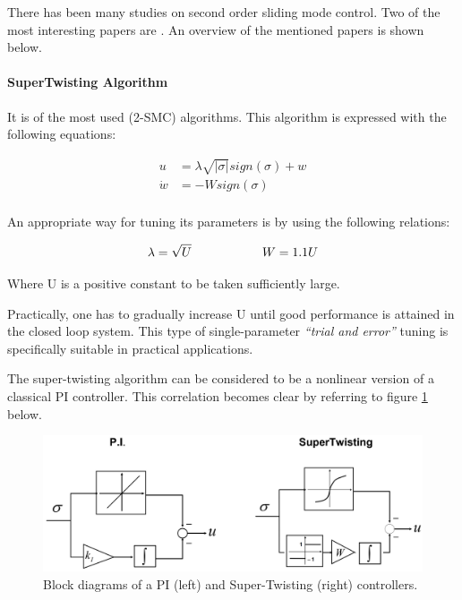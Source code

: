 \documentclass{thesisreport}
\begin{document}
There has been many studies on second order sliding mode control. Two of the most interesting papers are \cite{Levant1993, Bartolini1999}. An overview of the mentioned papers is shown below.


\paragraph{SuperTwisting Algorithm}

It is of the most used (2-SMC) algorithms. This algorithm is expressed with the following equations:

\begin{equation}
\begin{aligned}
	u &= \lambda \sqrt{|\sigma|}sign(\sigma) + w \\
	\dot{w} &= -W sign (\sigma) \\
\end{aligned}
\end{equation}


									
An appropriate way for tuning its parameters is by using the following relations: 

\begin{equation}
\lambda = \sqrt{U} \text{\hspace{2cm}} W = 1.1U
\end{equation}



\noindent Where U is a positive constant to be taken sufficiently large.



\noindent Practically, one has to gradually increase U until good performance is attained in the closed loop system. This type of single-parameter \textit{“trial and error”} tuning is specifically suitable in practical applications.

\noindent The super-twisting algorithm can be considered to be a nonlinear version of a classical PI controller. This correlation becomes clear by referring to figure \ref{PI_SuperTwisting} below.

\begin{figure}[h]
\centering
\includegraphics[width=\textwidth]{Images/Control/PI_SuperTwisting}
\caption{Block diagrams of a PI (left) and Super-Twisting (right) controllers.\cite{DeCarlo2008}}
\label{PI_SuperTwisting}
\end{figure}
\end{document}
